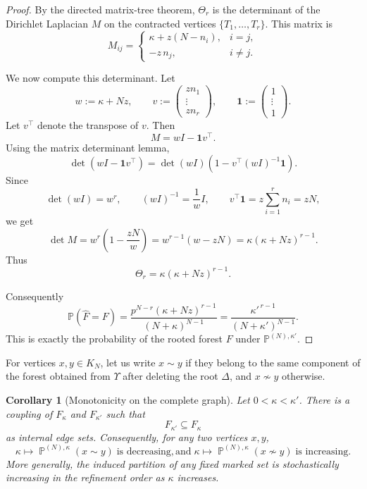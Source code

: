 \documentclass[11pt]{article}
\DeclareMathOperator{\PP}{\mathbb{P}}
\newtheorem{corollary}{Corollary}[section]
\begin{document}
\begin{proof}
By the directed matrix-tree theorem, \(\Theta_r\) is the determinant of the
Dirichlet Laplacian \(M\) on the contracted vertices
\(\{T_1,\dots,T_r\}\). This matrix is
\[
M_{ij}
=
\begin{cases}
\kappa+z(N-n_i), & i=j,\\
-z\,n_j, & i\ne j.
\end{cases}
\]

We now compute this determinant. Let
\[
w:=\kappa+Nz,
\qquad
v:=
\begin{pmatrix}
z n_1\\
\vdots\\
z n_r
\end{pmatrix},
\qquad
\mathbf 1:=
\begin{pmatrix}
1\\
\vdots\\
1
\end{pmatrix}.
\]
Let \(v^\top\) denote the transpose of \(v\). Then
\[
M=wI-\mathbf 1 v^\top .
\]
%
Using the matrix determinant lemma,
\[
\det(wI-\mathbf 1 v^\top)
=
\det(wI)\left(1-v^\top(wI)^{-1}\mathbf 1\right).
\]
Since
\[
\det(wI)=w^r,
\qquad
(wI)^{-1}=\frac1w I,
\qquad
v^\top\mathbf 1
=
z\sum_{i=1}^r n_i
=
zN,
\]
we get
\[
\det M
=
w^r\left(1-\frac{zN}{w}\right)
=
w^{r-1}(w-zN)
=
\kappa(\kappa+Nz)^{r-1}.
\]
Thus
\[
\Theta_r=\kappa(\kappa+Nz)^{r-1}.
\]

Consequently
\[
\mathbb P(\widehat F=F)
=
\frac{
p^{N-r}(\kappa+Nz)^{r-1}
}{
(N+\kappa)^{N-1}
}
=
\frac{\kappa'^{\,r-1}}
     {(N+\kappa')^{N-1}}.
\]
This is exactly the probability of the rooted forest \(F\) under
\(\mathbb P^{(N),\kappa'}\). 

\end{proof}

 For vertices \(x,y\in K_N\), let us write
\(x\sim y\) if they belong to the same component of the forest obtained from
\(\Upsilon\) after deleting the root \(\Delta\), and \(x\not\sim y\)
otherwise. 
\begin{corollary}[Monotonicity on the complete graph]
\label{cor:complete-graph-monotonicity}
Let \(0<\kappa<\kappa'\). There is a coupling of
\(F_\kappa\)
and
\(F_{\kappa'}\) such that
\[
F_{\kappa'}\subseteq F_\kappa
\]
as internal edge sets. Consequently, for any two vertices \(x,y\),
\[
\kappa\longmapsto \PP^{(N),\kappa}(x\sim y)
\;\text{is decreasing,}
\,\text{and}\;
\kappa\longmapsto \PP^{(N),\kappa}(x\not\sim y)
\;\text{is increasing.}
\]
More generally, the induced partition of any fixed marked set is
stochastically increasing in the refinement order as \(\kappa\) increases.
\end{corollary}
\end{document}
